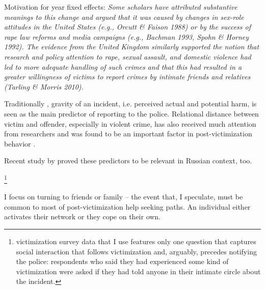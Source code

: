 \documentclass[]{article}
\begin{document}
Motivation for year fixed effects:
\textit{Some scholars have attributed substantive meanings to this change and argued that it was caused by changes in sex-role attitudes in the United States (e.g., Orcutt \& Faison 1988) or by the success of rape law reforms and media campaigns (e.g., Bachman 1993, Spohn \& Horney 1992). The evidence from the United Kingdom similarly supported the notion that research and policy attention to rape, sexual assault, and domestic violence had led to more adequate handling of such crimes and that this had resulted in a greater willingness of victims to report crimes by intimate friends and relatives (Tarling \& Morris 2010).}





Traditionally \citep{skogan1976citizen, skogan1984reporting, gottfredson1979study, tarling2010reporting}, gravity of an incident, i.e. perceived actual and potential harm, is seen as the main predictor of reporting to the police. Relational distance between victim and offender, especially in violent crime, has also received much attention from researchers and was found to be an important factor in post-victimization behavior \citep{felson1999victim, kaukinen2002help, knoth2019reporting}. 



Recent study by \cite{dzmitryieva2025crime} proved these predictors to be relevant in Russian context, too.


\footnote{victimization survey data that I use features only one question that captures social interaction that follows victimization and, arguably, precedes notifying the police: respondents who said they had experienced some kind of victimization were asked if they had told anyone in their intimate circle about the incident.}

 I focus on turning to friends or family -- the event that, I speculate, must be common to most of post-victimization help seeking paths. An individual either activates their network or they cope on their own.
 
\end{document}
